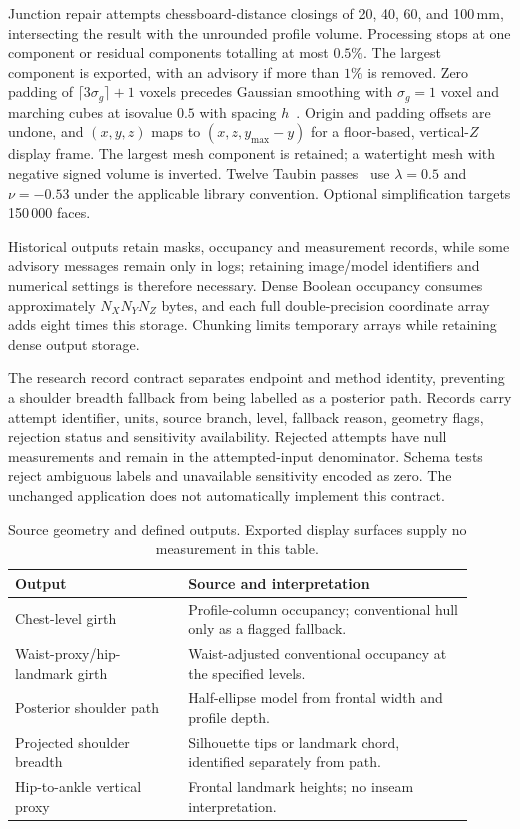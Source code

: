 \documentclass[11pt,a4paper]{article}
\begin{document}
Junction repair attempts chessboard-distance closings of 20, 40, 60, and 100\,mm, intersecting the result with the unrounded profile volume. Processing stops at one component or residual components totalling at most $0.5\%$. The largest component is exported, with an advisory if more than $1\%$ is removed. Zero padding of $\lceil3\sigma_g\rceil+1$ voxels precedes Gaussian smoothing with $\sigma_g=1$ voxel and marching cubes at isovalue $0.5$ with spacing $h$~\cite{lorensen1987marching}. Origin and padding offsets are undone, and $(x,y,z)$ maps to $(x,z,y_{\max}-y)$ for a floor-based, vertical-$Z$ display frame. The largest mesh component is retained; a watertight mesh with negative signed volume is inverted. Twelve Taubin passes~\cite{taubin1995signal} use $\lambda=0.5$ and $\nu=-0.53$ under the applicable library convention. Optional simplification targets 150\,000 faces.

Historical outputs retain masks, occupancy and measurement records, while some advisory messages remain only in logs; retaining image/model identifiers and numerical settings is therefore necessary. Dense Boolean occupancy consumes approximately $N_XN_YN_Z$ bytes, and each full double-precision coordinate array adds eight times this storage. Chunking limits temporary arrays while retaining dense output storage.

The research record contract separates endpoint and method identity, preventing a shoulder breadth fallback from being labelled as a posterior path. Records carry attempt identifier, units, source branch, level, fallback reason, geometry flags, rejection status and sensitivity availability. Rejected attempts have null measurements and remain in the attempted-input denominator. Schema tests reject ambiguous labels and unavailable sensitivity encoded as zero. The unchanged application does not automatically implement this contract.

\begin{table}[htbp]
\centering
\caption{Source geometry and defined outputs. Exported display surfaces supply no measurement in this table.}
\label{tab:branches}
\small
\begin{tabular}{p{0.34\linewidth}p{0.57\linewidth}}
\toprule
Output & Source and interpretation\\
\midrule
Chest-level girth & Profile-column occupancy; conventional hull only as a flagged fallback.\\
Waist-proxy/hip-landmark girth & Waist-adjusted conventional occupancy at the specified levels.\\
Posterior shoulder path & Half-ellipse model from frontal width and profile depth.\\
Projected shoulder breadth & Silhouette tips or landmark chord, identified separately from path.\\
Hip-to-ankle vertical proxy & Frontal landmark heights; no inseam interpretation.\\
\bottomrule
\end{tabular}
\end{table}
\end{document}
